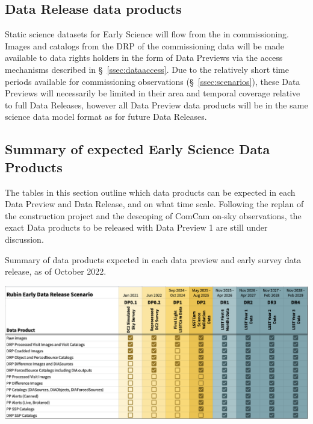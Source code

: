 \subsection{Data Release data products}
Static science datasets for Early Science will flow from the \svs in commissioning.
Images and catalogs from the DRP of the commissioning data will be made available to data rights holders in the form of Data Previews via the access mechanisms described in \S~\ref{ssec:dataaccess}.
Due to the relatively short time periods available for commissioning observations (\S~\ref{ssec:scenarios}), these Data Previews will necessarily be limited in their area and temporal coverage relative to full Data Releases, however all Data Preview data products will be in the same science data model format as for future Data Releases.


\subsection{Summary of expected Early Science Data Products} \label{ssec:dataproductsummary}
The tables in this section outline which data products can be expected in each Data Preview and Data Release, and on what time scale. 
Following the replan of the construction project and the descoping of ComCam on-sky observations, the exact Data products to be released with Data Preview 1 are still under discussion. 


\begin{table}
\caption{Summary of data products expected in each data preview and early survey data release, as of October 2022.}
\label{tab:summary}
\includegraphics[width=\linewidth]{figures/DPR-summary}
\end{table}


